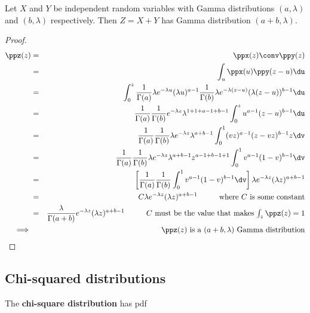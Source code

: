 \begin{theorem}
\label{thm:Gamma_X+Y}
Let $X$ and $Y$ be independent random variables with 
Gamma distributions $(a,\lambda)$ and $(b,\lambda)$ respectively.
Then $Z=X+Y$ has Gamma distribution $(a+b,\lambda)$.
\end{theorem}
\begin{proof}
\begin{eqnarray*}
  \ppz(z)
    &=& \ppx(z)\conv\ppy(z)
  \\&=& \int_u \ppx(u)\ppy(z-u) \du
  \\&=& \int_0^z
        \frac{1}{\Gamma(a)}\lambda e^{-\lambda u}(\lambda u)^{a-1}
        \frac{1}{\Gamma(b)}\lambda e^{-\lambda(z-u)}(\lambda(z-u))^{b-1} 
        \du
  \\&=& \frac{1}{\Gamma(a)}\frac{1}{\Gamma(b)}e^{-\lambda z}\lambda^{1+1+a-1+b-1}
        \int_0^z  u^{a-1}(z-u)^{b-1}  \du
  \\&=& \frac{1}{\Gamma(a)}\frac{1}{\Gamma(b)}\lambda e^{-\lambda z}\lambda^{a+b-1}
        \int_0^1  (vz)^{a-1}(z-vz)^{b-1}  z\dv
  \\&=& \frac{1}{\Gamma(a)}\frac{1}{\Gamma(b)}\lambda e^{-\lambda z}\lambda^{a+b-1}
        z^{a-1+b-1+1}
        \int_0^1  v^{a-1}(1-v)^{b-1}  \dv
  \\&=& \left[
        \frac{1}{\Gamma(a)}\frac{1}{\Gamma(b)}
        \int_0^1  v^{a-1}(1-v)^{b-1}  \dv
        \right]
        \lambda e^{-\lambda z}(\lambda z)^{a+b-1}
  \\&=& C\lambda e^{-\lambda z}(\lambda z)^{a+b-1}
      \hspace{1cm}\mbox{where $C$ is some constant} 
  \\&=& \frac{\lambda}{\Gamma(a+b)} e^{-\lambda z}(\lambda z)^{a+b-1}
      \hspace{1cm}\mbox{$C$ must be the value that makes $\int_z\ppz(z)=1$} 
\\\implies && \mbox{$\ppz(z)$ is a $(a+b,\lambda)$ Gamma distribution}
\end{eqnarray*}
\end{proof}

\subsection{Chi-squared distributions}
\begin{definition}
\label{def:pdf_chi}
The {\bf chi-square distribution} has pdf
\end{definition}


